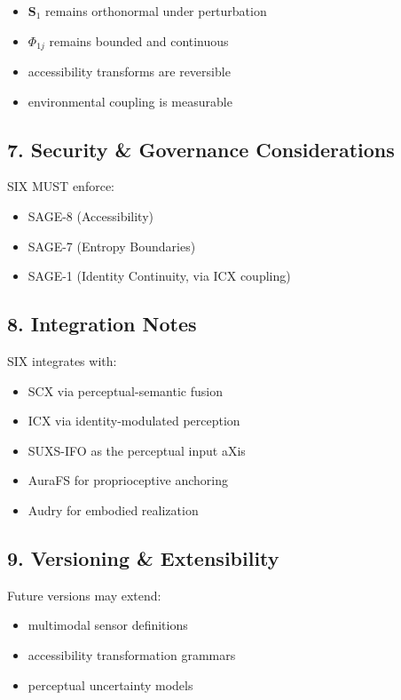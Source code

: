 \begin{itemize}
\tightlist
\item
  \(\mathbf{S}_1\) remains orthonormal under perturbation
\item
  \(\Phi_{1j}\) remains bounded and continuous
\item
  accessibility transforms are reversible
\item
  environmental coupling is measurable
\end{itemize}

\subsection{7. Security \& Governance Considerations}\label{security-governance-considerations}

SIX MUST enforce:

\begin{itemize}
\tightlist
\item
  SAGE-8 (Accessibility)
\item
  SAGE-7 (Entropy Boundaries)
\item
  SAGE-1 (Identity Continuity, via ICX coupling)
\end{itemize}

\subsection{8. Integration Notes}\label{integration-notes}

SIX integrates with:

\begin{itemize}
\tightlist
\item
  SCX via perceptual-semantic fusion
\item
  ICX via identity-modulated perception
\item
  SUXS-IFO as the perceptual input aXis
\item
  AuraFS for proprioceptive anchoring
\item
  Audry for embodied realization
\end{itemize}

\subsection{9. Versioning \& Extensibility}\label{versioning-extensibility}

Future versions may extend:

\begin{itemize}
\tightlist
\item
  multimodal sensor definitions
\item
  accessibility transformation grammars
\item
  perceptual uncertainty models
\end{itemize}
